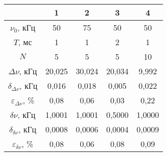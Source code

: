 \begin{table}
\centering
\label{tbl:7}
\begin{tabular}{|c|c|c|c|c|}
\hline
 & 1 & 2 & 3 & 4 \\
\hline
$\nu_0$, кГц & 50 & 75 & 50 & 50 \\
\cline{1-5}
$T$, мс & 1 & 1 & 2 & 1 \\
\cline{1-5}
$N$ & 5 & 5 & 5 & 10 \\
\cline{1-5}
$\Delta\nu$, кГц & 20,025 & 30,024 & 20,034 & 9,992 \\
\cline{1-5}
$\delta_{\Delta\nu}$, кГц & 0,016 & 0,018 & 0,005 & 0,022 \\
\cline{1-5}
$\varepsilon_{\Delta\nu}$, \% & 0,08 & 0,06 & 0,03 & 0,22 \\
\cline{1-5}
$\delta\nu$, кГц & 1,0001 & 1,0001 & 0,5000 & 1,0000 \\
\cline{1-5}
$\delta_{\delta\nu}$, кГц & 0,0008 & 0,0006 & 0,0004 & 0,0009 \\
\cline{1-5}
$\varepsilon_{\delta\nu}$, \% & 0,08 & 0,06 & 0,08 & 0,09 \\
\cline{1-5}
\hline
\end{tabular}
\end{table}

